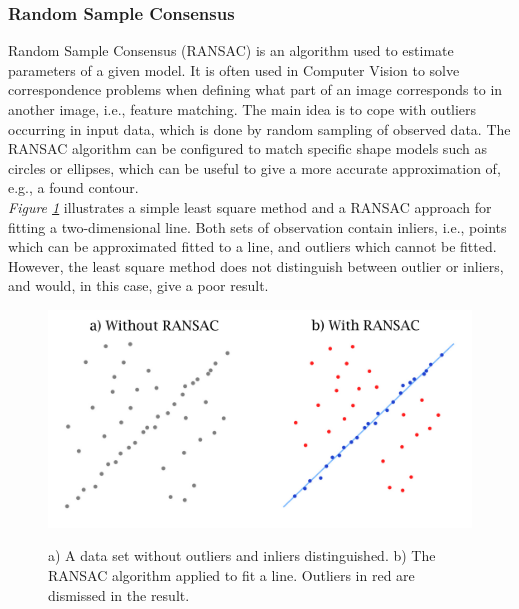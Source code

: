 \subsubsection{Random Sample Consensus}
Random Sample Consensus (RANSAC)\cite{Fischler} is an algorithm used to estimate parameters of a given model. It is often used in Computer Vision to solve correspondence problems when defining what part of an image corresponds to in another image, i.e., feature matching.  The main idea is to cope with outliers occurring in input data, which is done by random sampling of observed data. The RANSAC algorithm can be configured to match specific shape models such as circles or ellipses, which can be useful to give a more accurate approximation of, e.g., a found contour.\\

\noindent \textit{Figure \ref{fig:ransac chart}} illustrates a simple least square method and a RANSAC approach for fitting a two-dimensional line. Both sets of observation contain inliers, i.e., points which can be approximated fitted to a line, and outliers which cannot be fitted. However, the least square method does not distinguish between outlier or inliers, and would, in this case, give a poor result.\\

\begin{figure}[H]
    \begin{minipage}{\textwidth}
        \centering
        \includegraphics[width=0.8\linewidth]{figures/PDF/RANSAC.pdf}\\
        \caption{ a) A data set without outliers and inliers distinguished\protect\footnotemark. b) The RANSAC algorithm applied to fit a line. Outliers in red are dismissed in the result\protect\footnotemark.}
        \label{fig:ransac chart}
    \end{minipage}
\end{figure}


